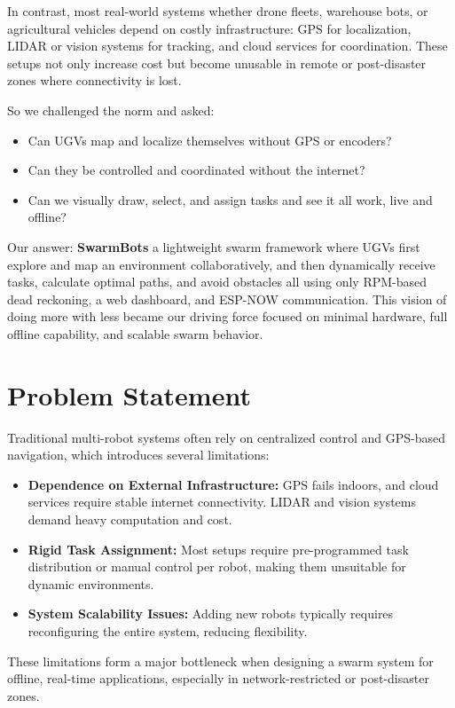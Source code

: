 \documentclass[a4paper,12pt]{report}
\begin{document}
In contrast, most real-world systems whether drone fleets, warehouse bots, or agricultural vehicles depend on costly infrastructure: GPS for localization, LIDAR or vision systems for tracking, and cloud services for coordination. These setups not only increase cost but become unusable in remote or post-disaster zones where connectivity is lost.

So we challenged the norm and asked:
\begin{itemize}
    \item Can UGVs map and localize themselves without GPS or encoders?
    \item Can they be controlled and coordinated without the internet?
    \item Can we visually draw, select, and assign tasks and see it all work, live and offline?
\end{itemize}

Our answer: \textbf{SwarmBots} a lightweight swarm framework where UGVs first explore and map an environment collaboratively, and then dynamically receive tasks, calculate optimal paths, and avoid obstacles all using only RPM-based dead reckoning, a web dashboard, and ESP-NOW communication. This vision of doing more with less became our driving force focused on minimal hardware, full offline capability, and scalable swarm behavior.
 \newpage

\section{Problem Statement}
Traditional multi-robot systems often rely on centralized control and GPS-based navigation, which introduces several limitations:

\begin{itemize}
    \item \textbf{Dependence on External Infrastructure:} GPS fails indoors, and cloud services require stable internet connectivity. LIDAR and vision systems demand heavy computation and cost.
    \item \textbf{Rigid Task Assignment:} Most setups require pre-programmed task distribution or manual control per robot, making them unsuitable for dynamic environments.
    \item \textbf{System Scalability Issues:} Adding new robots typically requires reconfiguring the entire system, reducing flexibility.
\end{itemize}
These limitations form a major bottleneck when designing a swarm system for offline, real-time applications, especially in network-restricted or post-disaster zones.
\end{document}
